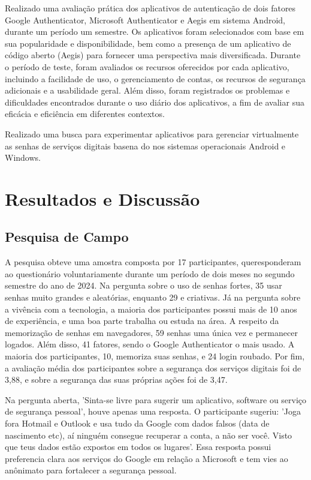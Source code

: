 \documentclass[12pt]{article}
\begin{document}
Realizado uma avaliação prática dos aplicativos de autenticação de dois
fatores Google Authenticator, Microsoft Authenticator e Aegis em sistema
Android, durante um período um semestre. Os aplicativos foram selecionados
com base em sua popularidade e disponibilidade, bem como a presença de um
aplicativo de código aberto (Aegis) para fornecer uma perspectiva mais
diversificada.
Durante o período de teste, foram avaliados os recursos oferecidos por cada
aplicativo, incluindo a facilidade de uso, o gerenciamento de contas, os
recursos de segurança adicionais e a usabilidade geral.
Além disso, foram registrados os problemas e dificuldades encontrados
durante o uso diário dos aplicativos, a fim de avaliar sua eficácia e
eficiência em diferentes contextos.

Realizado uma busca para experimentar aplicativos para gerenciar
virtualmente as senhas de serviços digitais basena do nos sistemas
operacionais Android e Windows.

\section{Resultados e Discussão}

\subsection{Pesquisa de Campo}

A pesquisa obteve uma amostra composta por 17 participantes, queresponderam
ao questionário voluntariamente durante um período de dois meses no segundo
semestre do ano de 2024.
Na pergunta sobre o uso de senhas fortes, 35%
usar senhas muito grandes e aleatórias, enquanto 29%
e criativas.
Já na pergunta sobre a vivência com a tecnologia, a maioria dos
participantes possui mais de 10 anos de experiência, e uma boa parte
trabalha ou estuda na área.
A respeito da memorização de senhas em navegadores, 59%
senhas uma única vez e permanecer logados.
Além disso, 41%
fatores, sendo o Google Authenticator o mais usado.
A maioria dos participantes, 10, memoriza suas senhas, e 24%
login roubado.
Por fim, a avaliação média dos participantes sobre a segurança dos serviços
digitais foi de 3,88, e sobre a segurança das suas próprias ações foi de
3,47.

Na pergunta aberta, 'Sinta-se livre para sugerir um aplicativo, software ou
serviço de segurança pessoal', houve apenas uma resposta.
O participante sugeriu: 'Joga fora Hotmail e Outlook e usa tudo da Google com
dados falsos (data de nascimento etc), aí ninguém consegue recuperar a conta,
a não ser você.
Visto que teus dados estão expostos em todos os lugares'.
Essa resposta possui preferencia clara aos serviços do Google em relação a
Microsoft e tem vies ao anônimato para fortalecer a segurança pessoal.
\end{document}
